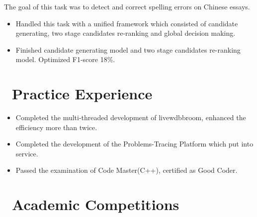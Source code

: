 \documentclass{resume}
\begin{document}
The goal of this task was to detect and correct spelling errors on Chinese essays.
\begin{itemize}
  \item Handled this task with a unified framework which consisted of candidate generating, two stage candidates re-ranking and global decision making.
  \item Finished candidate generating model and two stage candidates re-ranking model. Optimized F1-score 18\%.
\end{itemize}

\section{\faSitemap\ Practice Experience}
\begin{itemize}
  \item Completed the multi-threaded development of livewdbbroom, enhanced the efficiency more than twice.
  \item Completed the development of the Problems-Tracing Platform which put into service.
  \item Passed the examination of Code Master(C++), certified as Good Coder.
\end{itemize}




\section{\faHeart\ Academic Competitions}
\end{document}
